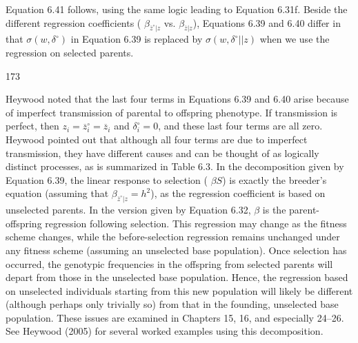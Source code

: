 \documentclass{article}
\begin{document}
Equation 6.41 follows, using the same logic leading to Equation 6.31f. Beside the different regression coefficients ( $ \beta_{\overline{z}^{\circ}|z} $ vs.  $ \beta_{\overline{z}|z} $), Equations 6.39 and 6.40 differ in that  $ \sigma(w,\delta^{\circ}) $ in Equation 6.39 is replaced by  $ \sigma(w,\delta^{\circ}||z) $ when we use the regression on selected parents.

173

Heywood noted that the last four terms in Equations 6.39 and 6.40 arise because of imperfect transmission of parental to offspring phenotype. If transmission is perfect, then  $ z_i = \overline{z}_i^\circ = \overline{z}_i $ and  $ \delta_i^\circ = 0 $, and these last four terms are all zero. Heywood pointed out that although all four terms are due to imperfect transmission, they have different causes and can be thought of as logically distinct processes, as is summarized in Table 6.3. In the decomposition given by Equation 6.39, the linear response to selection ( $ \beta S $) is exactly the breeder's equation (assuming that  $ \beta_{\overline{z}^\circ | z} = h^2 $), as the regression coefficient is based on unselected parents. In the version given by Equation 6.32,  $ \beta $ is the parent-offspring regression following selection. This regression may change as the fitness scheme changes, while the before-selection regression remains unchanged under any fitness scheme (assuming an unselected base population). Once selection has occurred, the genotypic frequencies in the offspring from selected parents will depart from those in the unselected base population. Hence, the regression based on unselected individuals starting from this new population will likely be different (although perhaps only trivially so) from that in the founding, unselected base population. These issues are examined in Chapters 15, 16, and especially 24–26. See Heywood (2005) for several worked examples using this decomposition.
\end{document}
